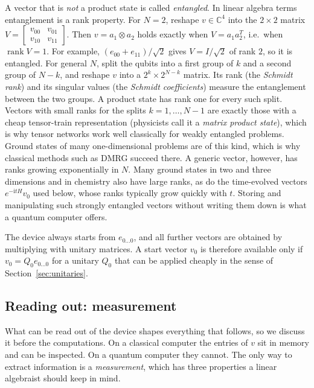 \documentclass[11pt,a4paper]{article}
\newcommand{\C}{\mathbb{C}}
\begin{document}
A vector that is \emph{not} a product state is called \emph{entangled}.
In linear algebra terms entanglement is a rank property. For $N=2$,
reshape $v\in\C^4$ into the $2\times2$ matrix
$V=\left[\begin{smallmatrix}v_{00}&v_{01}\\v_{10}&v_{11}\end{smallmatrix}\right]$.
Then $v=a_1\otimes a_2$ holds exactly when $V=a_1a_2^T$, i.e.\ when
$\operatorname{rank}V=1$. For example, $(e_{00}+e_{11})/\sqrt2$ gives
$V=I/\sqrt2$ of rank $2$, so it is entangled. For general $N$, split the
qubits into a first group of $k$ and a second group of $N-k$, and reshape
$v$ into a $2^k\times2^{N-k}$ matrix. Its rank (the \emph{Schmidt rank})
and its singular values (the \emph{Schmidt coefficients}) measure the
entanglement between the two groups. A product state has rank one for
every such split. Vectors with small ranks for the splits $k=1,\dots,N-1$
are exactly those with a cheap tensor-train representation (physicists
call it a \emph{matrix product state}), which is why tensor networks work
well classically for weakly entangled problems. Ground states of many
one-dimensional problems are of this kind, which is why classical
methods such as DMRG succeed there. A generic vector, however, has ranks
growing exponentially in $N$. Many ground states in two and three
dimensions and in chemistry also have large ranks, as do the time-evolved vectors
$e^{-\mathrm{i}tH}v_0$ used below, whose ranks typically grow quickly with $t$.
Storing and manipulating such strongly entangled vectors without writing
them down is what a quantum computer offers.

The device always starts from $e_{0\dots0}$, and all further
vectors are obtained by multiplying with unitary matrices. A start
vector $v_0$ is therefore available only if $v_0=Q_0e_{0\dots0}$ for a
unitary $Q_0$ that can be applied cheaply in the sense of
Section~\ref{sec:unitaries}.

\subsection{Reading out: measurement}\label{sec:measure}

What can be read out of the device shapes everything that follows, so we
discuss it before the computations. On a classical computer the entries
of $v$ sit in memory and can be inspected. On a quantum computer they
cannot. The only way to extract information is a \emph{measurement},
which has three properties a linear algebraist should keep in mind.
\end{document}
